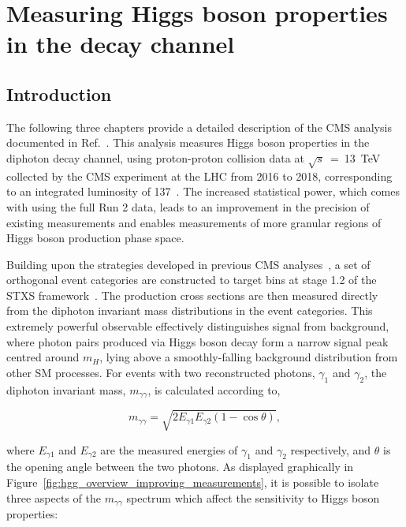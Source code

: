 \chapter{Measuring Higgs boson properties in the \Hgg decay channel}
\label{chap:hgg_overview}

\section{Introduction}
The following three chapters provide a detailed description of the CMS \Hgg analysis documented in Ref.~\cite{CMS-PAS-HIG-19-015}. This analysis measures Higgs boson properties in the diphoton decay channel, using proton-proton collision data at $\sqrt{s}$~=~13~TeV collected by the CMS experiment at the LHC from 2016 to 2018, corresponding to an integrated luminosity of 137~\fbinv. The increased statistical power, which comes with using the full Run 2 data, leads to an improvement in the precision of existing measurements and enables measurements of more granular regions of Higgs boson production phase space. 

Building upon the strategies developed in previous CMS \Hgg analyses~\cite{}, a set of orthogonal event categories are constructed to target bins at stage 1.2 of the STXS framework~\cite{}. The production cross sections are then measured directly from the diphoton invariant mass distributions in the event categories. This extremely powerful observable effectively distinguishes signal from background, where photon pairs produced via Higgs boson decay form a narrow signal peak centred around $m_H$, lying above a smoothly-falling background distribution from other SM processes. For events with two reconstructed photons, $\gamma_1$ and $\gamma_2$, the diphoton invariant mass, $m_{\gamma\gamma}$, is calculated according to,

\begin{equation}\label{eq:mgg}
    m_{\gamma\gamma} = \sqrt{2E_{\gamma1}E_{\gamma2}(1-\cos{\theta})},
\end{equation}

\noindent
where $E_{\gamma1}$ and $E_{\gamma2}$ are the measured energies of $\gamma_1$ and $\gamma_2$ respectively, and $\theta$ is the opening angle between the two photons. As displayed graphically in Figure~\ref{fig:hgg_overview_improving_measurements}, it is possible to isolate three aspects of the $m_{\gamma\gamma}$ spectrum which affect the sensitivity to Higgs boson properties: 

